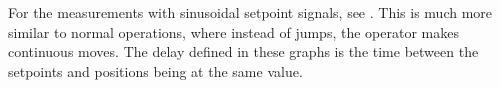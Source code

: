 %


For the measurements with sinusoidal setpoint signals, see . This is much more similar to normal operations, where instead of jumps, the operator makes continuous moves. The delay defined in these graphs is the time between the setpoints and positions being at the same value.

